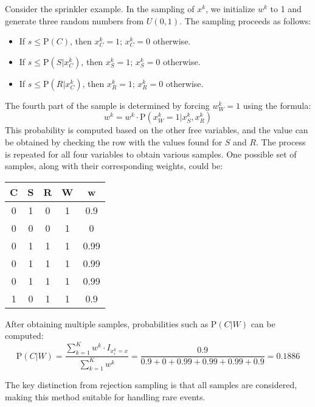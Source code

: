 \begin{example}
    Consider the sprinkler example. 
    In the sampling of $x^k$, we initialize $w^k$ to 1 and generate three random numbers from $U(0,1)$. 
    The sampling proceeds as follows:
    \begin{itemize}
        \item If $ s \leq \text{P}(C)$, then $x_C^k=1$; $x_C^k=0$ otherwise. 
        \item If $ s \leq \text{P}(S|x_C^k)$, then $x_S^k=1$; $x_S^k=0$ otherwise. 
        \item If $ s \leq \text{P}(R|x_C^k)$, then $x_R^k=1$; $x_R^k=0$ otherwise. 
    \end{itemize}
    The fourth part of the sample is determined by forcing $w^k_W=1$ using the formula: 
    \[w^k=w^k\cdot\text{P}\left( x_W^k=1|x_S^k,x_R^k \right)\]
    This probability is computed based on the other free variables, and the value can be obtained by checking the row with the values found for $S$ and $R$.
    The process is repeated for all four variables to obtain various samples. 
    One possible set of samples, along with their corresponding weights, could be:
    \begin{table}[H]
        \centering
        \begin{tabular}{ccccc}
        \hline
        \textbf{C} & \textbf{S} & \textbf{R} & \textbf{W} & \textbf{w}  \\ \hline
        0          & 1          & 0          & 1          & 0.9         \\
        0          & 0          & 0          & 1          & 0           \\
        0          & 1          & 1          & 1          & 0.99        \\
        0          & 1          & 1          & 1          & 0.99        \\
        0          & 1          & 1          & 1          & 0.99        \\
        1          & 0          & 1          & 1          & 0.9         \\ \hline
        \end{tabular}
    \end{table}
    After obtaining multiple samples, probabilities such as $\text{P}(C|W)$ can be computed:
    \[\text{P}(C|W)=\dfrac{\sum_{k=1}^Kw^k\cdot I_{x_i^k=x}}{\sum_{k=1}^Kw^k}=\dfrac{0.9}{0.9+0+0.99+0.99+0.99+0.9}=0.1886\]
\end{example}
The key distinction from rejection sampling is that all samples are considered, making this method suitable for handling rare events.

